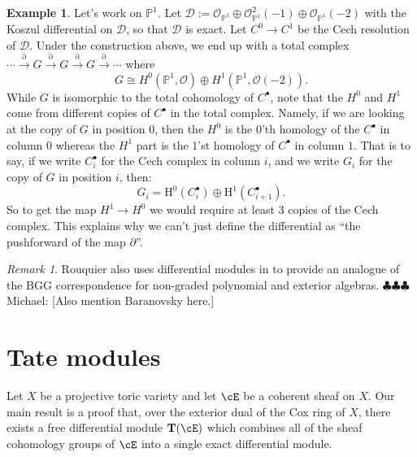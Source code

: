 \documentclass[12pt]{amsart}
\theoremstyle{definition}
\newtheorem{example}[lemma]{Example}
\theoremstyle{remark}
\newtheorem{remark}[lemma]{Remark}
\newcommand{\Tate}{{\mathbf{T}}}
\newcommand{\PP}{\mathbb P}
\newcommand{\HH}{\mathrm H}
\newcommand{\Pic}{\operatorname{Pic}}
\newcommand{\cO}{{\mathcal O}}
\newcommand{\daniel}[1]{{\color{blue} \sf $\clubsuit\clubsuit\clubsuit$ Daniel: [#1]}}
\newcommand{\michael}[1]{{\color{red} \sf $\clubsuit\clubsuit\clubsuit$ Michael: [#1]}}
\begin{document}
\begin{example}
Let's work on $\PP^1$.  Let $\mathcal D:= \cO_{\PP^1}\oplus \cO_{\PP^1}^2(-1) \oplus \cO_{\PP^1}(-2)$ with the Koszul differential on $\mathcal D$, so that $\mathcal D$ is exact.  Let $C^0\to C^1$ be the Cech resolution of $\mathcal D$. Under the construction above, we end up with a total complex
$
\cdots \overset{\partial}{\longrightarrow} G \overset{\partial}{\longrightarrow} G \overset{\partial}{\longrightarrow}G \overset{\partial}{\longrightarrow} \cdots
$
where
\[
G\cong H^0(\PP^1,\cO) \oplus H^1(\PP^1,\cO(-2)).
\]
While $G$ is isomorphic to the total cohomology of $C^\bullet$, note that the $H^0$ and $H^1$ come from different copies of $C^\bullet$ in the total complex.  Namely, if we are looking at the copy of $G$ in position $0$, then the $H^0$ is the $0$'th homology of the $C^\bullet$ in column $0$ whereas the $H^1$ part is the $1$'st homology of $C^\bullet$ in column $1$.  That is to say, if we write $C^\bullet_i$ for the Cech complex in column $i$, and we write $G_i$ for the copy of $G$ in position $i$, then:
\[
G_i = \HH^0(C^\bullet_i)\oplus  \HH^1(C^\bullet_{i+1}).
\]
So to get the map $H^1\to H^0$ we would require at least $3$ copies of the Cech complex.  This explains why we can't just define the differential as ``the pushforward of the map $\partial$''.
\end{example}

\begin{remark}
Rouquier also uses differential modules in \cite[Section 4]{rouquier} to provide an analogue of the BGG correspondence for non-graded polynomial and exterior algebras. \michael{Also mention Baranovsky here.}
\end{remark}



\section{Tate modules}
Let $X$ be a projective toric variety and let $\cE$ be a coherent sheaf on $X$.  Our main result is a proof that, over the exterior dual of the Cox ring of $X$, there exists a free differential module $\Tate(\cE)$ which combines all of the sheaf cohomology groups of $\cE$ into a single exact differential module.  

\end{document}
